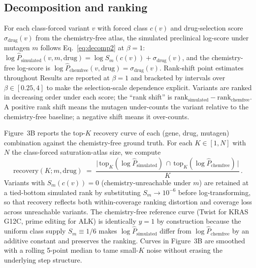 \documentclass[11pt,a4paper]{article}
\begin{document}
\subsection{Decomposition and ranking}

For each class-forced variant $v$ with forced class $c(v)$ and
drug-selection score $\sigma_{\mathrm{drug}}(v)$ from the chemistry-free
atlas, the simulated preclinical log-score under mutagen $m$ follows
Eq.~\ref{eq:decomp2} at $\beta = 1$:
$\log \hat{P}_{\mathrm{simulated}}(v, m, \mathrm{drug}) =
\log S_m(c(v)) + \sigma_{\mathrm{drug}}(v)$, and the chemistry-free
log-score is $\log \hat{P}_{\mathrm{chemfree}}(v, \mathrm{drug}) =
\sigma_{\mathrm{drug}}(v)$. Rank-shift point estimates throughout
Results are reported at $\beta = 1$ and bracketed by intervals over
$\beta \in [0.25, 4]$ to make the selection-scale dependence explicit. Variants are ranked in decreasing order
under each score; the ``rank shift'' is $\mathrm{rank}_{\mathrm{simulated}}
- \mathrm{rank}_{\mathrm{chemfree}}$. A positive rank shift means
the mutagen under-counts the variant relative to the chemistry-free
baseline; a negative shift means it over-counts.

Figure~3B reports the top-$K$ recovery curve of each (gene, drug, mutagen)
combination against the chemistry-free ground truth. For each $K \in [1, N]$
with $N$ the class-forced saturation-atlas size, we compute
\begin{equation}
    \mathrm{recovery}(K; m, \mathrm{drug})
    \;=\; \frac{\big|\,\mathrm{top}_K(\log \hat{P}_{\mathrm{simulated}})
          \,\cap\, \mathrm{top}_K(\log \hat{P}_{\mathrm{chemfree}})\,\big|}{K}
    \,.
\end{equation}
Variants with $S_m(c(v)) = 0$ (chemistry-unreachable under $m$) are retained
at a tied-bottom simulated rank by substituting $S_m \to 10^{-6}$ before
log-transforming, so that recovery reflects both within-coverage ranking
distortion and coverage loss across unreachable variants. The chemistry-free
reference curve (Twist \citep{feng2022} for KRAS G12C, prime editing
\citep{oh2026} for ALK) is identically $y = 1$ by construction because the
uniform class supply $S_m \equiv 1/6$ makes $\log \hat{P}_{\mathrm{simulated}}$
differ from $\log \hat{P}_{\mathrm{chemfree}}$ by an additive constant and
preserves the ranking. Curves in Figure~3B are smoothed with a rolling
5-point median to tame small-$K$ noise without erasing the underlying
step structure.
\end{document}
